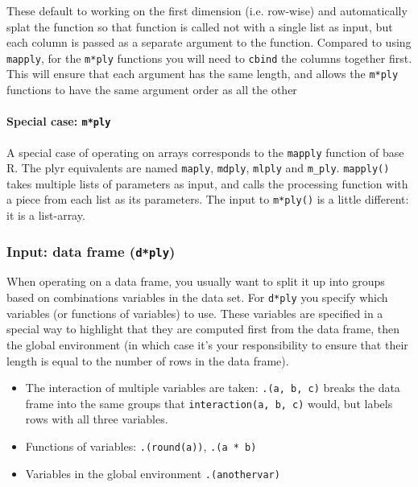 \documentclass[letterpage]{scrartcl}
\newcommand{\code}[1]{\lstinline!#1!}
\newcommand{\f}[1]{\lstinline!#1()!}
\begin{document}
These default to working on the first dimension (i.e. row-wise) and automatically splat the function so that function is called not with a single list as input, but each column is passed as a separate argument to the function.  Compared to using {\tt mapply}, for the {\tt m*ply} functions you will need to {\tt cbind} the columns together first.  This will ensure that each argument has the same length, and allows the {\tt m*ply} functions to have the same argument order as all the other 

\paragraph{Special case: \code{m*ply}}  A special case of operating on arrays corresponds to the {\tt mapply} function of base R.  The plyr equivalents are named {\tt maply}, {\tt mdply}, {\tt mlply} and {\tt m\_ply}.  \f{mapply} takes multiple lists of parameters as input, and calls the processing function with a piece from each list as its parameters.  The input to \f{m*ply} is a little different: it is a list-array.


\subsubsection{Input: data frame ({\tt d*ply})}

When operating on a data frame, you usually want to split it up into groups based on combinations variables in the data set.  For {\tt d*ply} you specify   which variables (or functions of variables) to use.  These variables are specified in a special way to highlight that they are computed first from the data frame, then the global environment (in which case it's your responsibility to ensure that their length is equal to the number of rows in the data frame).  

\begin{itemize}
  \item The interaction of multiple variables are taken: {\tt .(a, b, c)} breaks the data frame into the same groups that  \code{interaction(a, b, c)} would, but labels rows with all three variables.
  
  \item Functions of variables: {\tt .(round(a))}, {\tt .(a * b)}
  
  \item Variables in the global environment {\tt .(anothervar)}
\end{itemize}
\end{document}
